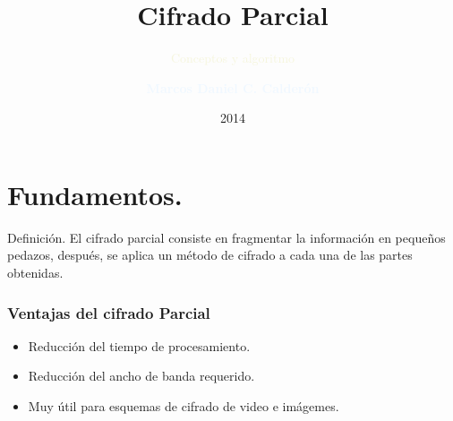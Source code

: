 \documentclass[10pt,fleqn]{beamer}
\begin{document}
{


\title{  \textcolor{blanco}{Cifrado Parcial}       \\}
\subtitle{    \textcolor{beige}{Conceptos y algoritmo}          }

\author{   {\bf  \textcolor{aliceblue}{Marcos Daniel C. Calderón}    }    \\ 
\vspace*{0.5cm}}
\date{   \textcolor{almond}{2014}     }
\frame{\titlepage}
}




\section{Fundamentos.}

\begin{frame}
\begin{block}{Definición.}
El cifrado parcial consiste en fragmentar la información en pequeños pedazos, después, se aplica un método de  cifrado a cada una de las partes obtenidas. 
\end{block}
\end{frame}


\begin{frame}
\frametitle{Ventajas del cifrado Parcial}
\begin{itemize}
\item Reducción del tiempo de procesamiento.
\item Reducción del ancho de banda requerido.
\item Muy útil para esquemas de cifrado de video e imágemes.
\end{itemize}
\end{frame}
\end{document}
